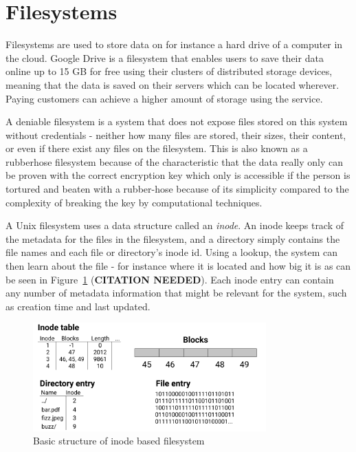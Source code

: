\section{Filesystems}
Filesystems are used to store data on for instance a hard drive of a computer in the cloud. Google Drive is a filesystem that enables users to save their data online up to 15 GB for free\cite{CloudStorageWork} using their clusters of distributed storage devices, meaning that the data is saved on their servers which can be located wherever\cite{DistributedStorageWhat}. Paying customers can achieve a higher amount of storage using the service.

A deniable filesystem is a system that does not expose files stored on this system without credentials - neither how many files are stored, their sizes, their content, or even if there exist any files on the filesystem\cite{petersDEFYDeniableFile2014}. This is also known as a rubberhose filesystem because of the characteristic that the data really only can be proven with the correct encryption key which only is accessible if the person is tortured and beaten with a rubber-hose because of its simplicity compared to the complexity of breaking the key by computational techniques.

A Unix filesystem uses a data structure called an \textit{inode}. An inode keeps track of the metadata for the files in the filesystem, and a directory simply contains the file names and each file or directory's inode id. Using a lookup, the system can then learn about the file - for instance where it is located and how big it is as can be seen in Figure~\ref{fig:inode_diag} (\textbf{CITATION NEEDED}). Each inode entry can contain any number of metadata information that might be relevant for the system, such as creation time and last updated.

\begin{figure}[!ht]
	\begin{center}
	  \includegraphics[width=0.8\textwidth]{figures/inode_diagram.png}
	\end{center}
	\caption{Basic structure of inode based filesystem}
	\label{fig:inode_diag}
\end{figure}

